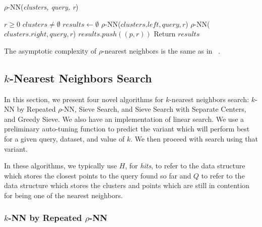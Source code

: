 \begin{algorithm} 
    \caption{$\rho$-NN(\emph{clusters, query, r})} 
    \label{alg:rnn} 
    \begin{algorithmic}[2]
        \REQUIRE $r \geq 0$
        \REQUIRE $clusters \neq \emptyset$
        \STATE $results \leftarrow \emptyset$
                \STATE $\rho$-NN($clusters.left, query, r$)
            \ENDIF
        \ENDIF
                \STATE $\rho$-NN($clusters.right, query, r$)
            \ENDIF
        \ENDIF
                    \STATE $results.push((p, r))$
                \ENDIF
            \ENDFOR
        \ENDIF
        \STATE Return $results$
    \end{algorithmic}
    \end{algorithm}


The asymptotic complexity of $\rho$-nearest neighbors is the same as in ~\cite{ishaq2019clustered}.

\subsection{\texorpdfstring{$k$}{k}-Nearest Neighbors Search}
\label{subsec:methods:knn-search}

In this section, we present four novel algorithms for $k$-nearest neighbors search: $k$-NN by Repeated $\rho$-NN, Sieve Search, and Sieve Search with Separate Centers, 
and  Greedy Sieve. 
We also have an implementation of linear search. We use a preliminary auto-tuning function to predict the variant which will perform 
best for a given query, dataset, and value of $k$. We then proceed with search using that variant.  

In these algorithms, we typically use $H$, for \emph{hits}, to refer to the data structure which stores the closest points to the query found so far and
$Q$ to refer to the data structure which stores the clusters and points which are still in contention for being one of the nearest neighbors.


\subsubsection{$k$-NN by Repeated $\rho$-NN}
\label{subsubsec:methods:knn-search:repeated-rnn}


